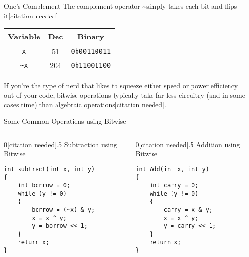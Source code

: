 \documentclass[11pt]{beamer}
\begin{document}

\begin{frame}{One's Complement}
The complement operator \textasciitilde simply takes each bit and flips it[citation needed].  
\center
\begin{tabular}{| c | c | c |}
\hline
Variable & Dec & Binary \\ \hline
\texttt{x} & 51 & \texttt{0b00110011} \\ \hline
\texttt{\textasciitilde x} & 204 & \texttt{0b11001100} \\ \hline
\end{tabular}
\flushleft
If you're the type of nerd that likes to squeeze either speed or power efficiency out of your code, bitwise operations typically take far less circuitry (and in some cases time) than algebraic operations[citation needed].  
\end{frame}

\begin{frame}[fragile=singleslide]{Some Common Operations using Bitwise}
\begin{columns}
\begin{column}{0[citation needed].5\textwidth}
Subtraction using Bitwise
\begin{lstlisting}[style=C]
int subtract(int x, int y) 
{ 
	int borrow = 0;
    while (y != 0) 
    { 
        borrow = (~x) & y; 
        x = x ^ y; 
        y = borrow << 1; 
    } 
    return x; 
} 
\end{lstlisting}
\end{column}
\begin{column}{0[citation needed].5\textwidth}
Addition using Bitwise
\begin{lstlisting}[style=C]
int Add(int x, int y)  
{  
	int carry = 0;
    while (y != 0)  
    {  
        carry = x & y;  
        x = x ^ y;  
        y = carry << 1;  
    }  
    return x;  
}  
\end{lstlisting}
\end{column}
\end{columns}
\end{frame}
\end{document}
